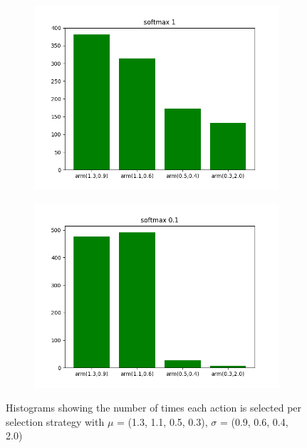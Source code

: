 \documentclass[letterpaper]{article}
\begin{document}
\begin{figure}[H]
\begin{subfigure}{.5\textwidth}
    \includegraphics[width=1\linewidth]{images/assign3/ex1/arms_softmax1}
    \caption{}
    \label{fig:arms_softmax1_ex1}
  \end{subfigure}
  \begin{subfigure}{.5\textwidth}
    \centering
    \includegraphics[width=1\linewidth]{images/assign3/ex1/arms_softmax01}
    \caption{}
    \label{fig:arms_softmax01_ex1}
  \end{subfigure}
    \caption{Histograms showing the number of times each action is selected
    per selection strategy with
    $\mu$ = (1.3, 1.1, 0.5, 0.3), $\sigma$ = (0.9, 0.6, 0.4, 2.0)}
    \label{fig:arms_ex1}
\end{figure}
\end{document}
